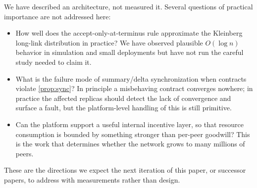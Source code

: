 We have described an architecture, not measured it. Several questions of practical importance are not addressed here:

\begin{itemize}[leftmargin=*, itemsep=2pt]
  \item How well does the accept-only-at-terminus rule approximate the Kleinberg long-link distribution in practice? We have observed plausible $O(\log n)$ behavior in simulation and small deployments but have not run the careful study needed to claim it.
  \item What is the failure mode of summary/delta synchronization when contracts violate \cref{prop:sync}? In principle a misbehaving contract converges nowhere; in practice the affected replicas should detect the lack of convergence and surface a fault, but the platform-level handling of this is still primitive.
  \item Can the platform support a useful internal incentive layer, so that resource consumption is bounded by something stronger than per-peer goodwill? This is the work that determines whether the network grows to many millions of peers.
\end{itemize}

These are the directions we expect the next iteration of this paper, or successor papers, to address with measurements rather than design.
